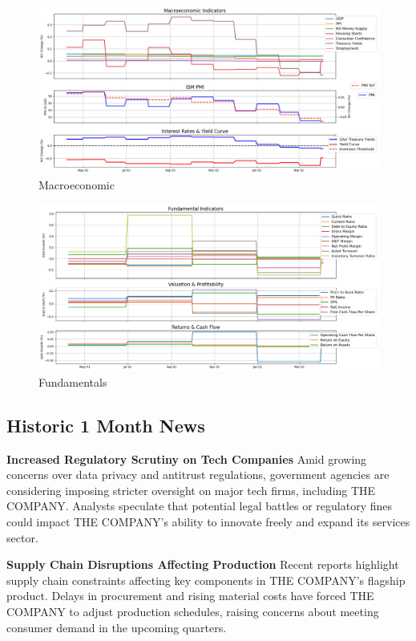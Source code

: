 \documentclass[8pt]{scrartcl}
\begin{document}
\begin{figure}[H]
    \centering
    \includegraphics[width=1\linewidth]{judge_reviews/AAPL_M_gpt-4o-mini/2019-04-07/judge_Macroeconomic_Indicators.png}
    \caption{Macroeconomic}
\end{figure}

\begin{figure}[H]
    \centering
    \includegraphics[width=1\linewidth]{judge_reviews/AAPL_M_gpt-4o-mini/2019-04-07/judge_Fundamental_Indicators.png}
    \caption{Fundamentals}
\end{figure}


\subsection*{Historic 1 Month News}

\textbf{Increased Regulatory Scrutiny on Tech Companies}
Amid growing concerns over data privacy and antitrust regulations, government agencies are considering imposing stricter oversight on major tech firms, including THE COMPANY. Analysts speculate that potential legal battles or regulatory fines could impact THE COMPANY’s ability to innovate freely and expand its services sector.

\textbf{Supply Chain Disruptions Affecting Production}
Recent reports highlight supply chain constraints affecting key components in THE COMPANY’s flagship product. Delays in procurement and rising material costs have forced THE COMPANY to adjust production schedules, raising concerns about meeting consumer demand in the upcoming quarters.
\end{document}
